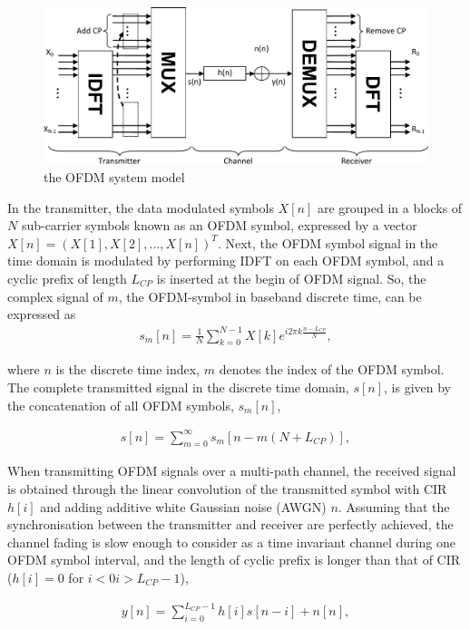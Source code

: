 \begin{figure}
	\centerline{\includegraphics [width=0.8\columnwidth] {Figures/OFDM-model.pdf} }
	\caption{the OFDM system model}
	\label{fig:OFDM-model}
\end{figure}

In the transmitter, the data modulated symbols $X[n]$ are grouped in a blocks of $N$ sub-carrier symbols known as an OFDM symbol, expressed by a vector $X[n]=(X[1], X[2], ..., X[n])^T$.
Next, the OFDM symbol signal in the time domain is modulated by performing IDFT on each OFDM symbol, and a cyclic prefix of length $L_{CP}$ is inserted at the begin of OFDM signal.
So, the complex signal of $m$, the OFDM-symbol in baseband discrete time, can be expressed as
\begin{eqnarray}
\label{equ:OFDMsymbol}
s_{m}[n] = \frac{1}{N} \sum_{k=0}^{N-1}X[k]e^{i2\pi k\frac{n-L_{CP}}{N}},
\end{eqnarray}

where $n$ is the discrete time index, $m$ denotes the index of the OFDM symbol.
The complete transmitted signal in the discrete time domain, $s[n]$, is given by the concatenation of all OFDM symbols, $s_{m}[n]$,

\begin{eqnarray}
\label{equ:OFDMsignal}
s[n] =  \sum_{m=0}^{\infty} s_{m}[n-m(N+L_{CP})],
\end{eqnarray}

When transmitting OFDM signals over a multi-path channel, the received signal is obtained through the linear convolution of the transmitted symbol with CIR $h[i]$ and adding additive white Gaussian noise (AWGN) $n$.
Assuming that the synchronisation between the transmitter and receiver are perfectly achieved, the channel fading is slow enough to consider as a time invariant channel during one OFDM symbol interval, and the length of cyclic prefix is longer than that of CIR ($h[i] = 0$ for $i < 0 i > L_{CP}-1$),

\begin{eqnarray}
\label{equ:OFDMchannelsignal}
y[n] =  \sum_{i=0}^{L_{CP}-1} h[i]s[n-i] + n[n],
\end{eqnarray}


